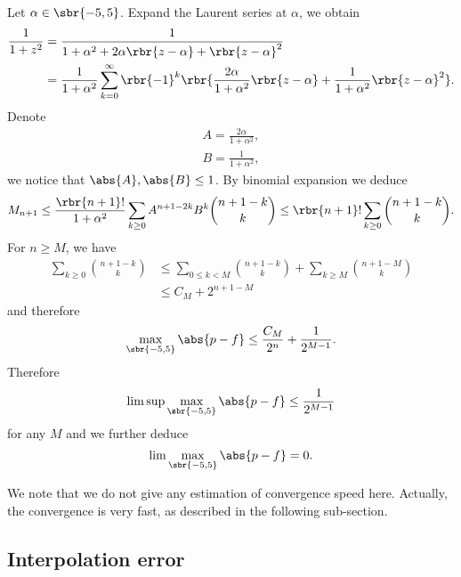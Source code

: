\documentclass[english, nochinese]{pnote}
\begin{document}
Let $ \alpha \in \sbr{ -5, 5 } $. Expand the Laurent series at $\alpha$, we obtain
\begin{equation}
\begin{split}
\frac{1}{ 1 + z^2 } &= \frac{1}{ 1 + \alpha^2 + 2 \alpha \rbr{ z - \alpha } + \rbr{ z - \alpha }^2 } \\
&= \frac{1}{ 1 + \alpha^2 } \sum_{ k = 0 }^{\infty} \rbr{-1}^k \rbr{ \frac{ 2 \alpha }{ 1 + \alpha^2 } \rbr{ z - \alpha } + \frac{1}{ 1 + \alpha^2 } \rbr{ z - \alpha }^2 }.
\end{split}
\end{equation}
Denote
\begin{gather}
A = \frac{ 2 \alpha }{ 1 + \alpha^2 }, \\
B = \frac{1}{ 1 + \alpha^2 },
\end{gather}
we notice that $ \abs{A}, \abs{B} \le 1 $. By binomial expansion we deduce
\begin{equation}
M_{ n + 1 } \le \frac{ \rbr{ n + 1 } ! }{ 1 + \alpha^2 } \sum_{ k \ge 0 } A^{ n + 1 - 2 k } B^k \binom{ n + 1 - k }{k} \le \rbr{ n + 1 } ! \sum_{ k \ge 0 } \binom{ n + 1 - k }{k}.
\end{equation}
For $ n \ge M $, we have
\begin{equation}
\begin{split}
\sum_{ k \ge 0 } \binom{ n + 1 - k }{k} &\le \sum_{ 0 \le k < M } \binom{ n + 1 - k }{k} + \sum_{ k \ge M } \binom{  n + 1 - M }{k} \\
&\le C_M + 2^{ n + 1 - M }
\end{split}
\end{equation}
and therefore
\begin{equation}
\max_{ \sbr{ -5, 5 } } \abs{ p - f } \le \frac{C_M}{2^n} + \frac{1}{2^{ M - 1 }}.
\end{equation}
Therefore
\begin{equation}
\limsup \max_{ \sbr{ -5, 5 } } \abs{ p - f } \le \frac{1}{2^{ M - 1 }}
\end{equation}
for any $M$ and we further deduce
\begin{equation}
\lim \max_{ \sbr{ -5, 5 } } \abs{ p - f } = 0.
\end{equation}

We note that we do not give any estimation of convergence speed here. Actually, the convergence is very fast, as described in the following sub-section.

\subsection{Interpolation error}
\end{document}
